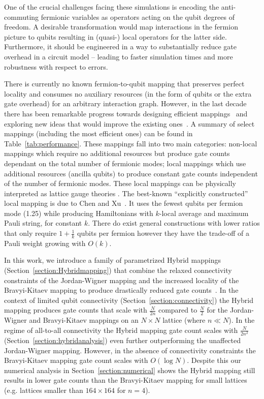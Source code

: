 \documentclass[pdftex,pra,aps,twocolumn,twoside]{revtex4-2}
\theoremstyle{plain}
\theoremstyle{note}
\newcommand\+{{\footnotesize \raisebox{0.3ex}{+}}}
\begin{document}
 One of the crucial challenges facing these simulations is encoding the anti-commuting fermionic variables as operators acting on the qubit degrees of freedom. A desirable transformation would map interactions in the fermion picture to qubits resulting in (quasi-) local operators for the latter side. Furthermore, it should be engineered in a way to substantially reduce gate overhead in a circuit model -- leading to faster simulation times and more robustness with respect to errors.

There is currently no known fermion-to-qubit mapping that preserves perfect locality and consumes no auxiliary resources (in the form of qubits or the extra gate overhead) for an arbitrary interaction graph. However, in the last decade there has been remarkable progress towards designing efficient mappings~\cite{Verstraete_2005, 
setia2019superfast,havlivcek2017operator,bravyi2002fermionic,seeley2012bravyi, derby2021compact,chen2022equivalence, steudtner2019quantum} and exploring new ideas that would improve the existing ones~\cite{chiew2021optimal}. A summary of select mappings (including the most efficient ones) can be found in Table~\ref{tab:performance}. These mappings fall into two main categories: non-local mappings which require no additional resources but produce gate counts dependant on the total number of fermionic modes; local mappings which use additional resources (ancilla qubits) to produce constant gate counts independent of the number of fermionic modes. These local mappings can be physically interpreted as lattice gauge theories \cite{Chen_2018}. The best-known “explicitly constructed” local mapping is due to Chen and Xu~\cite{chen2022equivalence}. It uses the fewest qubits per fermion mode (1.25) while producing Hamiltonians with $k$-local average and maximum Pauli string, for constant $k$. There do exist general constructions with lower ratios that only require $1+ \frac{1}{k}$ qubits per fermion however they have the trade-off of a Pauli weight growing with $O(k)$. 

In this work, we introduce a family of parametrized Hybrid mappings (Section~\ref{section:Hybridmapping}) that combine the relaxed connectivity constraints of the Jordan-Wigner mapping and the increased locality of the Bravyi-Kitaev mapping to produce drastically reduced gate counts~\cite{tranter2018comparison}. In the context of limited qubit connectivity (Section~\ref{section:connectivity}) the Hybrid mapping produces gate counts that scale with $\frac{N}{2n}$ compared to $\frac{N}{2}$ for the Jordan-Wigner and Bravyi-Kitaev mappings on an $N\times N$ lattice (where $n \ll N$). In the regime of all-to-all connectivity the Hybrid mapping gate count scales with $\frac{N}{2n^2}$ (Section~\ref{section:hybridanalysis}) even further outperforming the unaffected Jordan-Wigner mapping. However, in the absence of connectivity constraints the Bravyi-Kitaev mapping gate count scales with $O(\log N)$. Despite this our numerical analysis in Section~\ref{section:numerical} shows the Hybrid mapping still results in lower gate counts than the Bravyi-Kitaev mapping for small lattices (e.g. lattices smaller than $164 \times 164$ for $n=4$).
\end{document}
